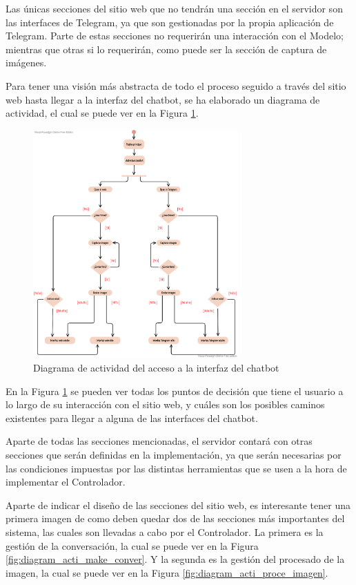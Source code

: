 Las únicas secciones del sitio web que no tendrán una sección en el servidor son las interfaces de Telegram, ya que son gestionadas por la propia aplicación de Telegram. Parte de estas secciones no requerirán una interacción con el Modelo; mientras que otras si lo requerirán, como puede ser la sección de captura de imágenes.

Para tener una visión más abstracta de todo el proceso seguido a través del sitio web hasta llegar a la interfaz del chatbot, se ha elaborado un diagrama de actividad, el cual se puede ver en la Figura \ref{fig:diagram_acti_sitio_web}.

\begin{figure}[h]
\centering
\includegraphics[width=0.7\textwidth]{imagenes/06_Diseno/diagram_acti_sitio_web.png}
\caption{Diagrama de actividad del acceso a la interfaz del chatbot}
\label{fig:diagram_acti_sitio_web}
\end{figure}

En la Figura \ref{fig:diagram_acti_sitio_web} se pueden ver todas los puntos de decisión que tiene el usuario a lo largo de su interacción con el sitio web, y cuáles son los posibles caminos existentes para llegar a alguna de las interfaces del chatbot.

Aparte de todas las secciones mencionadas, el servidor contará con otras secciones que serán definidas en la implementación, ya que serán necesarias por las condiciones impuestas por las distintas herramientas que se usen a la hora de implementar el Controlador.

Aparte de indicar el diseño de las secciones del sitio web, es interesante tener una primera imagen de como deben quedar dos de las secciones más importantes del sistema, las cuales son llevadas a cabo por el Controlador. La primera es la gestión de la conversación, la cual se puede ver en la Figura \ref{fig:diagram_acti_make_conver}. Y la segunda es la gestión del procesado de la imagen, la cual se puede ver en la Figura \ref{fig:diagram_acti_proce_imagen}.

